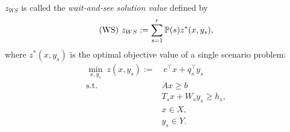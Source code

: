 $z_{WS}$ is called the \textit{wait-and-see solution value} defined by
\begin{align} \label{ws}
	\textrm{(WS) }z_{WS}:=\sum_{s=1}^r \operatorname*{\mathbb{P}}(s)z^*(x,y_s),
\end{align}
where $z^*(x,y_s)$ is the optimal objective value of a single scenario problem: 
\begin{subequations}
	\begin{align}
	\min_{x,y_s}\ z(x,y_s):=&\ c^\top x+q_s^\top y_s \label{ssp:obj}\\
	\mathrm{s.t.}\ &Ax \ge b \label{ssp:b}\\
	&T_s x + W_s y_s\ge h_s,  \label{ssp:c}\\
	&x\in X,  \label{ssp:d}\\
	&y_s \in Y. \label{ssp:e}
	\end{align}
\end{subequations}


